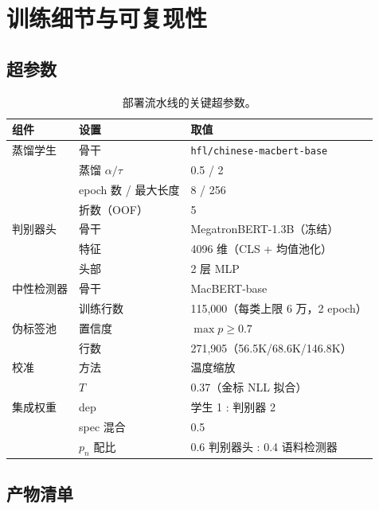 \documentclass[11pt,a4paper]{article}
\newcommand{\code}[1]{\texttt{#1}}
\begin{document}
\section{训练细节与可复现性}
\label{app:repro}

\subsection{超参数}

\begin{table}[H]
\centering\small
\caption{部署流水线的关键超参数。}
\label{tab:hparams}
\begin{tabular}{lll}
\toprule
组件 & 设置 & 取值 \\
\midrule
蒸馏学生   & 骨干 & \code{hfl/chinese-macbert-base} \\
           & 蒸馏 $\alpha/\tau$ & 0.5 / 2 \\
           & epoch 数 / 最大长度 & 8 / 256 \\
           & 折数（OOF） & 5 \\
判别器头   & 骨干 & MegatronBERT-1.3B（冻结） \\
           & 特征 & 4096 维（CLS + 均值池化） \\
           & 头部 & 2 层 MLP \\
中性检测器 & 骨干 & MacBERT-base \\
           & 训练行数 & 115{,}000（每类上限 6 万，2 epoch） \\
伪标签池   & 置信度 & $\max p \ge 0.7$ \\
           & 行数 & 271{,}905（56.5K/68.6K/146.8K） \\
校准       & 方法 & 温度缩放 \\
           & $T$ & 0.37（金标 NLL 拟合） \\
集成权重   & dep & 学生 1 : 判别器 2 \\
           & spec 混合 & 0.5 \\
           & $p_n$ 配比 & 0.6 判别器头 : 0.4 语料检测器 \\
\bottomrule
\end{tabular}
\end{table}

\subsection{产物清单}
\end{document}
